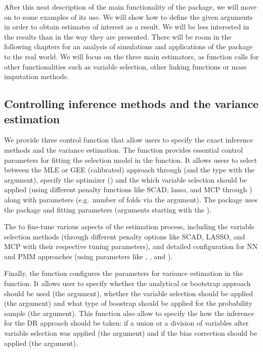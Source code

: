 \documentclass[
]{jss}
\begin{document}
After this neat description of the main functionality of the package, we
will move on to some examples of its use. We will show how to define the
given arguments in order to obtain estimates of interest as a result. We
will be less interested in the results than in the way they are
presented. There will be room in the following chapters for an analysis
of simulations and applications of the package to the real world. We
will focus on the three main estimators, as function calls for other
functionalities such as variable selection, other linking functions or
mass imputation methods.

\subsection{Controlling inference methods and the variance
estimation}\label{controlling-inference-methods-and-the-variance-estimation}

We provide three control function that allow users to specify the exact
inference methods and the variance estimation. The 
function provides essential control parameters for fitting the selection
model in the  function. It allows users to select between
the MLE or GEE (calibrated) approach through  (and
the type with the  argument), specify the optimizer
() and the which variable selection should be applied
(using different penalty functions like SCAD, lasso, and MCP through
) along with parameters (e.g.~number of folds via the
 argument). The package uses the  package and
fitting parameters (arguments starting with the ).

The  to fine-tune various aspects of the estimation
process, including the variable selection methods (through different
penalty options like SCAD, LASSO, and MCP with their respective tuning
parameters), and detailed configuration for NN and PMM approaches (using
parameters like , , and
).

Finally, the  function configures the parameters for
variance estimation in the  function. It allows user to
specify whether the analytical or bootstrap approach should be used (the
 argument), whether the variable selection should be
applied (the  argument) and what type of boostrap
should be applied for the probability sample (the 
argument). This function also allow to specify the how the inference for
the DR approach should be taken: if a union or a division of variables
after variable selection was applied (the  argument) and
if the bias correction should be applied (the 
argument).
\end{document}
